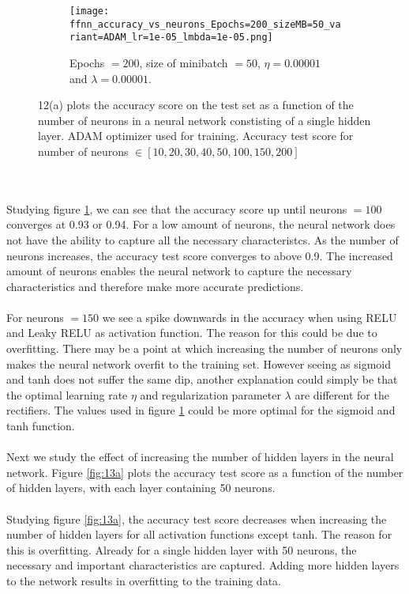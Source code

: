 \documentclass[a4paper,twocolumn]{article}
\begin{document}
\begin{figure}[ht]
    \centering
    \begin{subfigure}[b]{\columnwidth}
        \texttt{[image: ffnn\_accuracy\_vs\_neurons\_Epochs=200\_sizeMB=50\_variant=ADAM\_lr=1e-05\_lmbda=1e-05.png]}
        \caption{Epochs $= 200$, size of minibatch $= 50$, $\eta = 0.00001$ and $\lambda = 0.00001$.}
    \end{subfigure}
    \caption{12(a) plots the accuracy score on the test set as a function of the number of neurons in a neural network constisting of a single hidden layer. ADAM optimizer used for training. Accuracy test score for number of neurons $\in [10, 20, 30, 40, 50, 100, 150, 200]$}
    \label{fig:12a}
\end{figure}\\
\\
Studying figure \ref{fig:12a}, we can see that the accuracy score up until neurons $= 100$ converges at 0.93 or 0.94. For a low amount of neurons, the neural network does not have the ability to capture all the necessary characteristcs. As the number of neurons increases, the accuracy test score converges to above 0.9. The increased amount of neurons enables the neural network to capture the necessary characteristics and therefore make more accurate predictions.\\
\\
For neurons $= 150$ we see a spike downwards in the accuracy when using RELU and Leaky RELU as activation function. The reason for this could be due to overfitting. There may be a point at which increasing the number of neurons only makes the neural network overfit to the training set. However seeing as sigmoid and tanh does not suffer the same dip, another explanation could simply be that the optimal learning rate $\eta$ and regularization parameter $\lambda$ are different for the rectifiers. The values used in figure \ref{fig:12a} could be more optimal for the sigmoid and tanh function.\\
\\
Next we study the effect of increasing the number of hidden layers in the neural network. Figure \ref{fig:13a} plots the accuracy test score as a function of the number of hidden layers, with each layer containing 50 neurons.\\
\\
Studying figure \ref{fig:13a}, the accuracy test score decreases when increasing the number of hidden layers for all activation functions except tanh. The reason for this is overfitting. Already for a single hidden layer with 50 neurons, the necessary and important characteristics are captured. Adding more hidden layers to the network results in overfitting to the training data.
\end{document}
